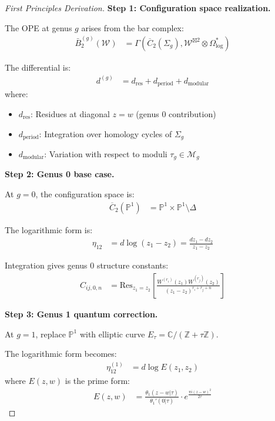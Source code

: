 \begin{proof}[First Principles Derivation]
\textbf{Step 1: Configuration space realization.}

The OPE at genus $g$ arises from the bar complex:
\begin{align}
\bar{B}_2^{(g)}(\mathcal{W}) &= \Gamma(\overline{C}_2(\Sigma_g), \mathcal{W}^{\boxtimes 2} \otimes \Omega^*_{\log})
\end{align}

The differential is:
\begin{align}
d^{(g)} &= d_{\text{res}} + d_{\text{period}} + d_{\text{modular}}
\end{align}
where:
\begin{itemize}
\item $d_{\text{res}}$: Residues at diagonal $z=w$ (genus 0 contribution)
\item $d_{\text{period}}$: Integration over homology cycles of $\Sigma_g$
\item $d_{\text{modular}}$: Variation with respect to moduli $\tau_g \in \mathcal{M}_g$
\end{itemize}

\textbf{Step 2: Genus 0 base case.}

At $g=0$, the configuration space is:
\begin{align}
\overline{C}_2(\mathbb{P}^1) &= \mathbb{P}^1 \times \mathbb{P}^1 \setminus \Delta
\end{align}

The logarithmic form is:
\begin{align}
\eta_{12} &= d\log(z_1 - z_2) = \frac{dz_1 - dz_2}{z_1 - z_2}
\end{align}

Integration gives genus 0 structure constants:
\begin{align}
C_{ij,0,n} &= \text{Res}_{z_1 = z_2} \left[ \frac{W^{(r_i)}(z_1) W^{(r_j)}(z_2)}{(z_1-z_2)^{r_i+r_j+n}} \right]
\end{align}

\textbf{Step 3: Genus 1 quantum correction.}

At $g=1$, replace $\mathbb{P}^1$ with elliptic curve $E_\tau = \mathbb{C}/(\mathbb{Z} + \tau\mathbb{Z})$.

The logarithmic form becomes:
\begin{align}
\eta_{12}^{(1)} &= d\log E(z_1,z_2)
\end{align}
where $E(z,w)$ is the prime form:
\begin{align}
E(z,w) &= \frac{\theta_1(z-w|\tau)}{\theta_1'(0|\tau)} \cdot e^{\frac{\pi i (z-w)^2}{2\tau}}
\end{align}


\end{proof}
